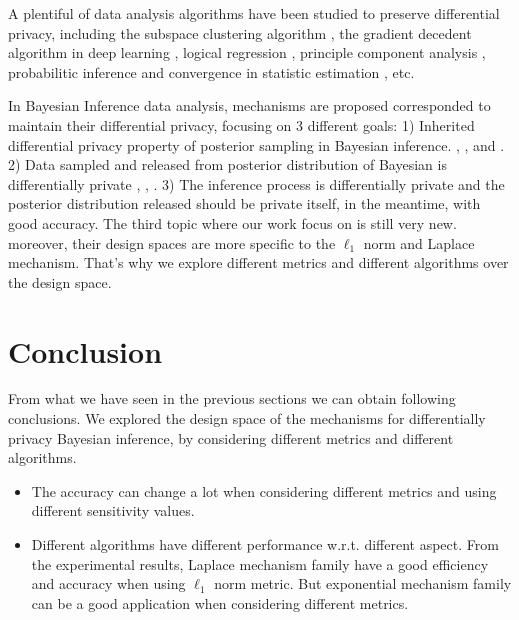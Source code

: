 \documentclass{article}
\begin{document}
A plentiful of data analysis algorithms have been studied to preserve differential privacy, including the subspace clustering algorithm \cite{wang2015differentially}, the gradient decedent algorithm in deep learning \cite{abadi2016deep}, logical regression \cite{chaudhuri2009privacy}, principle component analysis \cite{chaudhuri2012near}, probabilitic inference \cite{williams2010probabilistic} and convergence in statistic estimation \cite{chaudhuri2012convergence}, etc. 

In Bayesian Inference data analysis, mechanisms are proposed corresponded to maintain their differential privacy, focusing on 3 different goals: 1) Inherited differential privacy property of posterior sampling in Bayesian inference. \cite{dimitrakakis2014robust}, \cite{zhang2016differential}, \cite{zheng2015differential} and \cite{wang2015privacy}. 2) Data sampled and released from posterior distribution of Bayesian is differentially private \cite{Zhang2017privbayes}, \cite{dimitrakakis2015differential},  \cite{foulds2016theory}. 3) The inference process is differentially private and the posterior distribution released should be private itself, in the meantime, with good accuracy. The third topic where our work focus on is still very new. moreover, their design spaces are more specific to the $\ell_1$ norm and Laplace mechanism. That's why we explore different metrics and different algorithms over the design space.


\section{Conclusion}
From what we have seen in the previous sections we can obtain following conclusions. We explored the design space of the mechanisms for differentially privacy Bayesian inference, by considering different metrics and different algorithms.
\begin{itemize}
  \item The accuracy can change a lot when considering different metrics and using different sensitivity values.
  \item Different algorithms have different performance w.r.t. different aspect. From the experimental results, Laplace mechanism family have a good efficiency and accuracy when using $\ell_1$ norm metric. But exponential mechanism family can be a good application when considering different metrics.
\end{itemize}




\end{document}
